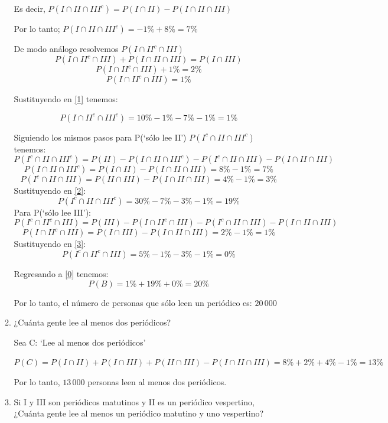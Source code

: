 \documentclass[letterpaper,11pt]{article}
\renewcommand{%
	\contentsname}{\vspace{-1cm} \hfill\bfseries\LARGE Índice \hfill \vspace{0.2cm}%
}
\begin{document}
\begin{enumerate}
\begin{enumerate}
	Es decir, $P(I \cap II \cap III^c) = P(I \cap II) - P (I \cap II \cap III) $

	Por lo tanto; $P(I \cap II \cap III^c) = - 1\% + 8\% = 7\%$

	De modo análogo resolvemos $P(I \cap II^c \cap III)$	
	$$P(I \cap II^c \cap III) + P(I \cap II \cap III) = P(I \cap III)$$
	$$P(I \cap II^c \cap III) + 1\% = 2\% $$
	$$P(I \cap II^c \cap III) = 1\% $$

	Sustituyendo en \eqref{1} tenemos:

	$$ P(I \cap II^c \cap III^c) = 10\% - 1\% - 7\% - 1\% = 1\% $$

	Siguiendo los mismos pasos para P(`sólo lee II') $P(I^c \cap II \cap III^c)$ tenemos: 
	\begin{equation}\label{2}
		P(I^c \cap II \cap III^c) = P(II) - P(I \cap II \cap III^c) - P(I^c \cap II \cap III) - P(I \cap II \cap III)
	\end{equation}
	$$
	P(I \cap II \cap III^c) = P(I \cap II)-P(I \cap II \cap III) = 8\% - 1\% = 7\%
	$$
	$$
	P(I^c \cap II \cap III) = P(II \cap III)-P(I \cap II \cap III) = 4\% - 1\% = 3\%
	$$
	Sustituyendo en \eqref{2}: 
	$$
	P(I^c \cap II \cap III^c) = 30\% - 7\% -3\% -1\% = 19\% 
	$$
	\clearpage
	Para P(`sólo lee III'):
	\begin{equation}\label{3}
		P(I^c \cap II^c \cap III) = P(III) - P(I \cap II^c \cap III) - P(I^c \cap II \cap III) - P(I \cap II \cap III)
	\end{equation}
	$$
	P(I \cap II^c \cap III) = P(I \cap III)-P(I \cap II \cap III) = 2\% - 1\% = 1\%
	$$	
	Sustituyendo en \eqref{3}: 
	$$
	P(I^c \cap II^c \cap III) = 5\% - 1\% -3\% -1\% = 0\% 
	$$

	Regresando a \eqref{0} tenemos: 
	$$
	P(B) = 1\% + 19\% +0\% = 20\%
	$$

	Por lo tanto, el número de personas que sólo leen un periódico es: $20\,000$

	\item ¿Cuánta gente lee al menos dos periódicos?
	
	Sea C: `Lee al menos dos periódicos'

	$P(C) = P(I \cap II) + P(I \cap III) + P(II \cap III) - P(I \cap II \cap III) = 8\% +2\% +4\% - 1\% = 13\%$

	Por lo tanto, $13\,000$ personas leen al menos dos periódicos.

	\item Si I y III son periódicos matutinos y II es un periódico vespertino, ¿Cuánta gente lee al menos un periódico matutino y uno vespertino?
	

\end{enumerate}
\end{enumerate}
\end{document}
